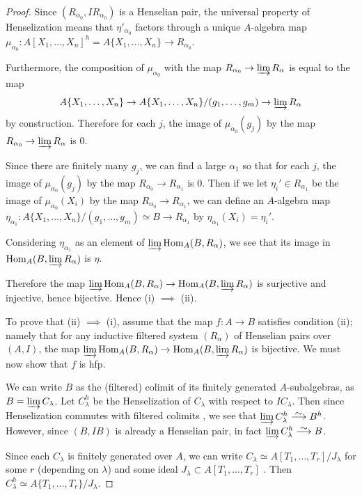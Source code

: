 \documentclass[12pt]{article}
\newcommand\simto{\stackrel{\textstyle\sim}{\smash{\longrightarrow}\rule{0pt}{0.4ex}}}
\newcommand{\Hom}{{\rm Hom}}
\newcommand{\colim}{\varinjlim}
\newcommand{\hfp}{hfp\xspace}
\newcommand{\spcite}[2]{\cite[\href{https://stacks.math.columbia.edu/tag/#1}{{#2} {#1}}]{stackp}}
\theoremstyle{definition}
\numberwithin{equation}{subsection}
\begin{document}
\begin{proof}
Since $(R_{\alpha_0},IR_{\alpha_0})$ is a Henselian pair, the universal property of Henselization means that $\eta'_{\alpha_0}$ factors through a unique $A$-algebra map $\mu_{\alpha_0}: A[X_1,\dots,X_n]^h = A\{X_1,\dots,X_n\} \to R_{\alpha_0}$. 

Furthermore, the composition of $\mu_{\alpha_0}$ with the map $R_{\alpha_0} \to \colim R_{\alpha}$ is equal to the map $$A\{X_1,\dots,X_n\} \to A\{X_1,\dots,X_n\}/(g_1,\dots,g_m) \to \colim R_{\alpha}$$ by construction. Therefore for each $j$, the image of $\mu_{\alpha_0}(g_j)$ by the map $R_{\alpha_0} \to \colim R_{\alpha}$ is $0$. 



Since there are finitely many $g_j$, we can find a large $\alpha_1$ so that for each $j$, the image of $\mu_{\alpha_0}(g_j)$ by the map $R_{\alpha_0} \to R_{\alpha_1}$ is $0$. Then if we let $\eta_i' \in R_{\alpha_1}$ be the image of $\mu_{\alpha_0}(X_i)$ by the map $R_{\alpha_0} \to R_{\alpha_1}$, we can define an $A$-algebra map $\eta_{\alpha_1}: A\{X_1,\dots,X_n\}/(g_1,\dots,g_m) \simeq B \to R_{\alpha_1}$ by $\eta_{\alpha_1}(X_i)=\eta_i'$.

Considering $\eta_{\alpha_1}$ as an element of $\colim \Hom_A(B,R_\alpha)$, we see that its image in $\Hom_A(B,\colim R_\alpha)$ is $\eta$. 

Therefore the map $\colim \Hom_A(B,R_\alpha) \to \Hom_A(B,\colim R_\alpha)$ is surjective and injective, hence bijective. Hence (i) $\implies$ (ii).

To prove that (ii) $\implies$ (i), assume that the map $f: A \to B$ satisfies condition (ii); namely that for any inductive filtered system $(R_\alpha)$ of Henselian pairs over $(A,I)$, the map $\colim \Hom_A(B,R_\alpha) \to \Hom_A(B,\colim R_\alpha)$ is bijective. We must now show that $f$ is \hfp.

We can write $B$ as the (filtered) colimit of its finitely generated $A$-subalgebras, as $B = \colim C_\lambda$. Let $C_\lambda^h$ be the Henselization of $C_\lambda$ with respect to $IC_\lambda$. Then since Henselization commutes with filtered colimits \spcite{0A04}{Lemma}, we see that $\colim C_\lambda^h \simto B^h$. However, since $(B,IB)$ is already a Henselian pair, in fact $\colim C_\lambda^h \simto B$.

Since each $C_\lambda$ is finitely generated over $A$, we can write $C_\lambda \simeq A[T_1,\dots,T_r]/J_\lambda$ for some $r$ (depending on $\lambda$) and some ideal $J_\lambda \subset A[T_1,\dots,T_r]$ . Then $C_\lambda^h \simeq A\{T_1,\dots,T_r\}/J_\lambda$. 


\end{proof}
\end{document}
